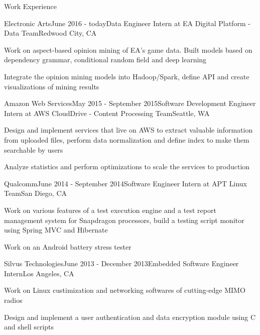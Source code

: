 \documentclass{resume} %
\begin{document}
\begin{rSection}{Work Experience}

\begin{rSubsection}{Electronic Arts}{June 2016 - today}{Data Engineer Intern at EA Digital Platform - Data Team}{Redwood City, CA}
\item Work on aspect-based opinion mining of EA's game data. Built models based on dependency grammar, conditional random field and deep learning
\item Integrate the opinion mining models into Hadoop/Spark, define API and create visualizations of mining results
\end{rSubsection}



\begin{rSubsection}{Amazon Web Services}{May 2015 - September 2015}{Software Development Engineer Intern at AWS CloudDrive - Content Processing Team}{Seattle, WA}
\item Design and implement services that live on AWS to extract valuable information from uploaded files, perform data normalization and define index to make them searchable by users
\item Analyze statistics and perform optimizations to scale the services to production
\end{rSubsection}


\begin{rSubsection}{Qualcomm}{June 2014 - September 2014}{Software Engineer Intern at APT Linux Team}{San Diego, CA}
\item Work on various features of a test execution engine and a test report management system for Snapdragon processors, build a testing script monitor using Spring MVC and Hibernate
\item Work on an Android battery stress tester
\end{rSubsection}


\begin{rSubsection}{Silvus Technologies}{June 2013 - December 2013}{Embedded Software Engineer Intern}{Los Angeles, CA}
\item Work on Linux custimization and networking softwares of cutting-edge MIMO radios
\item Design and implement a user authentication and data encryption module using C and shell scripts
\end{rSubsection}

\end{rSection}
\end{document}
